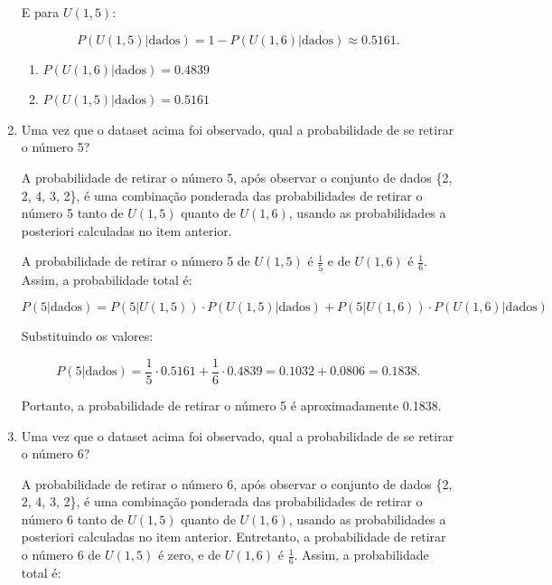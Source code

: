 \documentclass[12 pt]{article}
\begin{document}
\begin{enumerate}
\begin{tcolorbox}[colback=white, colframe=black, title=Resposta:]
        E para \( U(1,5) \):
    
        \[
        P(U(1,5) | \text{dados}) = 1 - P(U(1,6) | \text{dados}) \approx 0.5161.
        \]
        
        \begin{enumerate}
            \item \( P(U(1,6) | \text{dados}) =  0.4839 \)
            \item \( P(U(1,5) | \text{dados}) =  0.5161 \)
        \end{enumerate}
    \end{tcolorbox}
    \newpage
    \item Uma vez que o dataset acima foi observado, qual a probabilidade de se retirar o número 5?
    \begin{tcolorbox}[colback=white, colframe=black, title=Resposta:]
        A probabilidade de retirar o número 5, após observar o conjunto de dados \{2, 2, 4, 3, 2\}, é uma combinação ponderada das probabilidades de retirar o número 5 tanto de \( U(1,5) \) quanto de \( U(1,6) \), usando as probabilidades a posteriori calculadas no item anterior.

        A probabilidade de retirar o número 5 de \( U(1,5) \) é \( \frac{1}{5} \) e de \( U(1,6) \) é \( \frac{1}{6} \). Assim, a probabilidade total é:

        \[
        P(5 | \text{dados}) = P (5 | U(1,5)) \cdot P(U(1,5) | \text{dados}) + P(5 | U(1,6)) \cdot P(U(1,6) | \text{dados})
        \]
    
        Substituindo os valores:

        \[
        P(5 | \text{dados}) = \frac{1}{5} \cdot 0.5161 + \frac{1}{6} \cdot 0.4839 = 0.1032 + 0.0806 = 0.1838.
        \]
    
    
        Portanto, a probabilidade de retirar o número 5 é aproximadamente 0.1838.
    \end{tcolorbox}
    \item Uma vez que o dataset acima foi observado, qual a probabilidade de se retirar o número 6?
    \begin{tcolorbox}[colback=white, colframe=black, title=Resposta:]
    A probabilidade de retirar o número 6, após observar o conjunto de dados \{2, 2, 4, 3, 2\}, é uma combinação ponderada das probabilidades de retirar o número 6 tanto de \( U(1,5) \) quanto de \( U(1,6) \), usando as probabilidades a posteriori calculadas no item anterior. Entretanto, a probabilidade de retirar o número 6 de \( U(1,5) \) é zero, e de \( U(1,6) \) é \( \frac{1}{6} \). Assim, a probabilidade total é:


\end{tcolorbox}
\end{enumerate}
\end{document}
